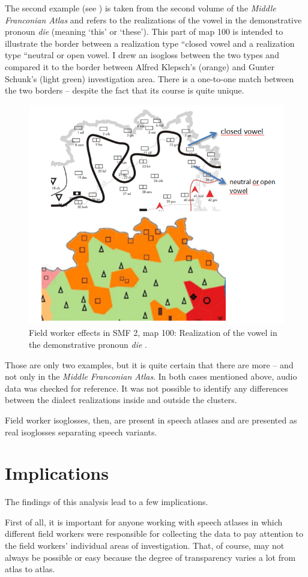 \documentclass[output=paper]{LSP/langsci}
\begin{document}
The second example (see ) is taken from the second volume of the \textit{Middle Franconian Atlas} and refers to the realizations of the vowel in the demonstrative pronoun \textit{die} (meaning `this' or `these'). This part of map 100 is intended to illustrate the border between a realization type ``closed vowel{\textquotedbl} and a realization type ``neutral or open vowel{\textquotedbl}. I drew an isogloss between the two types and compared it to the border between Alfred Klepsch's (orange) and Gunter Schunk's (light green) investigation area. There is a one-to-one match between the two borders – despite the fact that its course is quite unique.

\begin{figure}
\includegraphics[width=.4\textwidth]{illustrations/mathus_fig12}
\caption{Field worker effects in SMF 2, map 100: Realization of the vowel in the demonstrative pronoun \textit{die} \citep[241]{mathussek_sprachraume_2014}.}
\label{fig:mathus:12}
\end{figure}

\largerpage[-1]
Those are only two examples, but it is quite certain that there are more – and not only in the \textit{Middle Franconian Atlas}. In both cases mentioned above, audio data was checked for reference. It was not possible to identify any differences between the dialect realizations inside and outside the clusters.

Field worker isoglosses, then, are present in speech atlases and are presented as real isoglosses separating speech variants.

\section{Implications}
The findings of this analysis lead to a few implications.

First of all, it is important for anyone working with speech atlases in which different field workers were responsible for collecting the data to pay attention to the field workers' individual areas of investigation. That, of course, may not always be possible or easy because the degree of transparency varies a lot from atlas to atlas.
\end{document}
